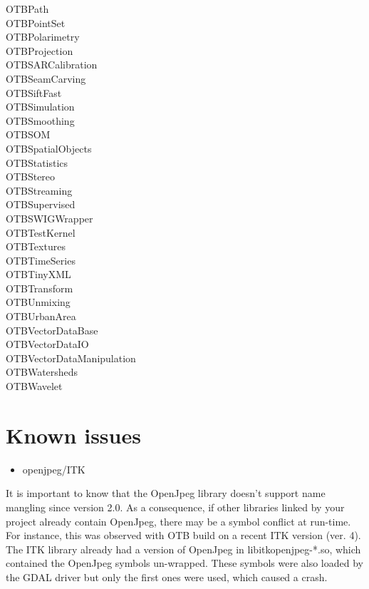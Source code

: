 \begin{multicols}{3}
OTBPath \\
OTBPointSet \\
OTBPolarimetry \\
OTBProjection \\
OTBSARCalibration \\
OTBSeamCarving \\
OTBSiftFast \\
OTBSimulation \\
OTBSmoothing \\
OTBSOM \\
OTBSpatialObjects \\
OTBStatistics \\
OTBStereo \\
OTBStreaming \\
OTBSupervised \\
OTBSWIGWrapper \\
OTBTestKernel \\
OTBTextures \\
OTBTimeSeries \\
OTBTinyXML \\
OTBTransform \\
OTBUnmixing \\
OTBUrbanArea \\
OTBVectorDataBase \\
OTBVectorDataIO \\
OTBVectorDataManipulation \\
OTBWatersheds \\
OTBWavelet \\
\end{multicols}


\section{Known issues}
\label{sec:knownissues}

\begin{itemize}
\item  openjpeg/ITK 
\end{itemize}

It is important to know that the OpenJpeg library doesn't support name mangling since version 2.0. 
As a consequence, if other libraries linked by your project already contain OpenJpeg, there may be a symbol conflict at run-time. 
For instance, this was observed with OTB build on a recent ITK version (ver. 4). 
The ITK library already had a version of OpenJpeg in libitkopenjpeg-*.so, which contained the OpenJpeg symbols un-wrapped.
These symbols were also loaded by the GDAL driver but only the first ones were used, which caused a crash. 

